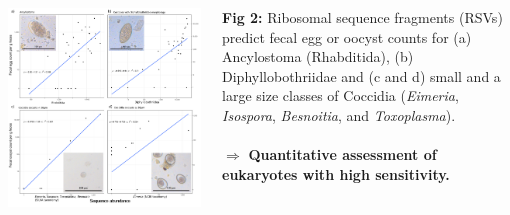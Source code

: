 \documentclass[30pt, a0paper, portrait, margin=0mm, innermargin=15mm,
               blockverticalspace=15mm, colspace=15mm, subcolspace=8mm]{tikzposter}
\begin{document}
\begin{columns}
      {
        \begin{minipage}{0.7\linewidth}                  
          \begin{left}
            \includegraphics[scale=0.7]{Figure2_man.png}
          \end{left}
        \end{minipage}
        \hfill
        \begin{minipage}{0.3\linewidth}
          \textbf{Fig 2:} Ribosomal sequence fragments (RSVs) predict
          fecal egg or oocyst counts for (a) Ancylostoma (Rhabditida),
          (b) Diphyllobothriidae and (c and d) small and a large size
          classes of Coccidia (\textit{Eimeria}, \textit{Isospora},
          \textit{Besnoitia}, and \textit{Toxoplasma}).
          \\ \\ $\Rightarrow$
          \textbf{Quantitative assessment of eukaryotes with high
            sensitivity.}
        \end{minipage}
      }


\end{columns}
\end{document}
